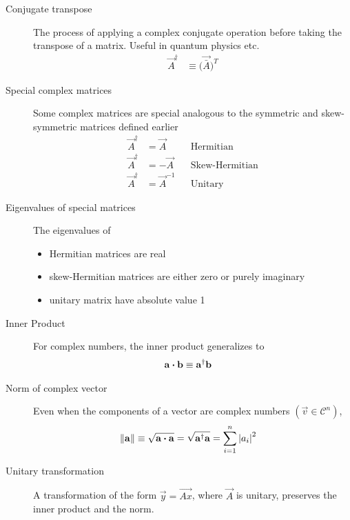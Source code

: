 \begin{description}
    \item[Conjugate transpose] The process of applying a complex conjugate operation
        before taking the transpose of a matrix. Useful in quantum physics etc.
        \begin{align}
            \vec{A}^\dag & \equiv \big( \vec{\bar{A}} \big)^T
        \end{align}

    \item[Special complex matrices] Some complex matrices are special analogous to the
        symmetric and skew-symmetric matrices defined earlier
        \begin{align}
            \vec{A}^\dag & = \vec{A}      &  & \text{Hermitian}      \\
            \vec{A}^\dag & = -\vec{A}     &  & \text{Skew-Hermitian} \\
            \vec{A}^\dag & = \vec{A}^{-1} &  & \text{Unitary}
        \end{align}

    \item[Eigenvalues of special matrices] The eigenvalues of
        \begin{itemize}
            \item Hermitian matrices are real
            \item skew-Hermitian matrices are either zero or purely imaginary
            \item unitary matrix have absolute value 1
        \end{itemize}

    \item[Inner Product] For complex numbers, the inner product generalizes to
        \begin{align}
            \mathbf{a} \boldsymbol{\cdot} \mathbf{b} & \equiv \mathbf{a}^\dag \mathbf{b}
        \end{align}

    \item[Norm of complex vector] Even when the components of a vector are complex
        numbers $ (\vec{v} \in \mathcal{C}^n) $,
        \begin{align}
            \lVert\mathbf{a}\rVert & \equiv \sqrt{\mathbf{a} \boldsymbol{\cdot} \mathbf{a}}
            = \sqrt{\mathbf{a}^\dag \mathbf{a}} = \sum_{i=1}^{n} \left\lvert  a_i  \right\rvert^2
        \end{align}

    \item[Unitary transformation] A transformation of the form $ \vec{y} = \vec{Ax} $,
        where $ \vec{A} $ is unitary, preserves the inner product and the norm.


\end{description}
